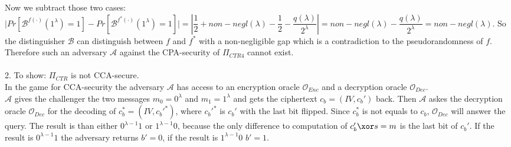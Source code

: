 Now we subtract those two cases:\\
\(\vert Pr[\mathcal{B}^{f(\cdot)}(1^\lambda) = 1] - Pr[\mathcal{B}^{f^*(\cdot)}(1^\lambda) = 1] \vert = \left\vert \dfrac{1}{2} + non-negl(\lambda) - \dfrac{1}{2} - \dfrac{q(\lambda)}{2^\lambda} \right\vert = non-negl(\lambda) - \dfrac{q(\lambda)}{2^\lambda} = non-negl(\lambda) \). So the distinguisher \(\mathcal{B}\) can distinguish between \(f\) and \(f^*\) with a non-negligible gap which is a contradiction to the pseudorandomness of \(f\). Therefore such an adversary \(\mathcal{A}\) against the CPA-security of \(\Pi_{CTR4}\) cannot exist.\\
\\
2. To show: \(\Pi_{CTR}\) is not CCA-secure.\\
In the game for CCA-security the adversary \(\mathcal{A}\) has access to an encryption oracle \(\mathcal{O}_{Enc}\) and a decryption oracle \(\mathcal{O}_{Dec}\). \\
\(\mathcal{A}\) gives the challenger the two messages \(m_0 = 0^\lambda\) and \(m_1 = 1^\lambda\) and gets the ciphertext \(c_b = (IV, c_b')\) back. Then \(\mathcal{A}\) askes the decryption oracle \(\mathcal{O}_{Dec}\) for the decoding of \(c_b^* = (IV, c_b'^*)\), where \(c_b'^*\) is \(c_b'\) with the last bit flipped. Since \(c_b^*\) is not equals to \(c_b\), \(\mathcal{O}_{Dec}\) will answer the query. The result is than either \(0^{\lambda -1}1\) or \(1^{\lambda-1}0\), because the only difference to computation of \(c_b' \xor s = m\) is the last bit of \(c_b'\).
If the result is \(0^{\lambda -1}1\) the adversary returns \(b' = 0\), if the result is \(1^{\lambda-1}0\) \(b' = 1\). 

